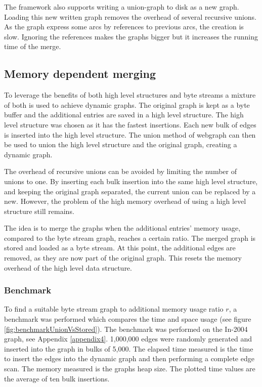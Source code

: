 The framework also supports writing a union-graph to disk as a new graph. Loading this new written graph removes the overhead of several recursive unions. As the graph express some arcs by references to previous arcs, the creation is slow. Ignoring the references makes the graphs bigger but it increases the running time of the merge.

\subsection{Memory dependent merging}
To leverage the benefits of both high level structures and byte streams a mixture of both is used to achieve dynamic graphs. The original graph is kept as a byte buffer and the additional entries are saved in a high level structure. The high level structure was chosen as it has the fastest insertions. Each new bulk of edges is inserted into the high level structure. The union method of webgraph can then be used to union the high level structure and the original graph, creating a dynamic graph.

The overhead of recursive unions can be avoided by limiting the number of unions to one. By inserting each bulk insertion into the same high level structure, and keeping the original graph separated, the current union can be replaced by a new. However, the problem of the high memory overhead of using a high level structure still remains. 

The idea is to merge the graphs when the additional entries' memory usage, compared to the byte stream graph, reaches a certain ratio. The merged graph is stored and loaded as a byte stream. At this point, the additional edges are removed, as they are now part of the original graph. This resets the memory overhead of the high level data structure.


\subsubsection{Benchmark}
To find a suitable byte stream graph to additional memory usage ratio $r$, a benchmark was performed which compares the time and space usage (see figure \ref{fig:benchmarkUnionVsStored}). The benchmark was performed on the In-2004 graph, see Appendix \ref{appendix4}. 1,000,000 edges were randomly generated and inserted into the graph in bulks of 5,000. The elapsed time measured is the time to insert the edges into the dynamic graph and then performing a complete edge scan. The memory measured is the graphs heap size. The plotted time values are the average of ten bulk insertions.


